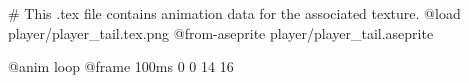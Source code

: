 # This .tex file contains animation data for the associated texture.
@load player/player_tail.tex.png
@from-aseprite player/player_tail.aseprite

@anim loop
	@frame 100ms 0 0 14 16

